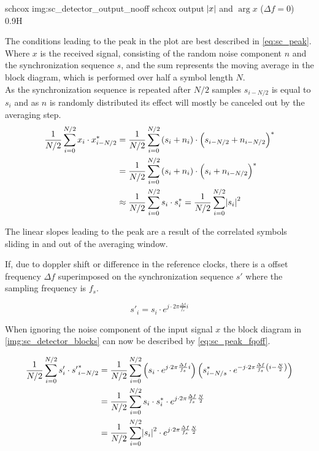 \begin{subchapter}{\acrlong{schcox}}
               {img:sc_detector_output_nooff}
               {\acrshort{schcox} output $\abs{x}$ and $\arg{x}$ ($\Delta f=0$)}
               {0.9}{H}

  The conditions leading to the peak in the plot are best
  described in \autoref{eq:sc_peak}.
  Where $x$ is the received signal, consisting of the
  random noise component $n$ and the synchronization sequence $s$,
  and the sum represents the moving average in the block diagram,
  which is performed over half a symbol length $N$. \\

  As the synchronization sequence is repeated after $N/2$ samples
  $s_{i-N/2}$ is equal to $s_{i}$ and as $n$ is randomly distributed
  its effect will mostly be canceled out by the averaging step. \\

  \begin{align}
    \label{eq:sc_peak}
    \frac{1}{N/2} \sum_{i=0}^{N/2} x_{i} \cdot x_{i-N/2}^\ast &=
    \frac{1}{N/2} \sum_{i=0}^{N/2} \left(s_{i} + n_{i} \right) \cdot \left(s_{i-N/2} + n_{i-N/2} \right)^\ast \nonumber \\
    &= \frac{1}{N/2} \sum_{i=0}^{N/2} \left(s_{i} + n_{i} \right) \cdot \left(s_{i} + n_{i-N/2} \right)^\ast \nonumber \\
    &\approx \frac{1}{N/2} \sum_{i=0}^{N/2} s_{i} \cdot s_{i}^\ast
    = \frac{1}{N/2} \sum_{i=0}^{N/2} \abs{s_{i}}^2
  \end{align}

  The linear slopes leading to the peak are a result of the
  correlated symbols sliding in and out of the averaging
  window.

  If, due to doppler shift or difference in the reference clocks,
  there is a offset frequency $\Delta f$ superimposed on the
  synchronization sequence $s'$ where the sampling frequency is $f_s$.

  \begin{equation*}
    s'_{i}= s_{i} \cdot e^{j\cdot 2 \pi \frac{\Delta f}{f_s}i}
  \end{equation*}

  When ignoring the noise component of the input signal $x$ the
  block diagram in \autoref{img:sc_detector_blocks} can
  now be described by \autoref{eq:sc_peak_fqoff}.

  \begin{align}
    \label{eq:sc_peak_fqoff}
    \frac{1}{N/2} \sum_{i=0}^{N/2} s'_{i} \cdot {s'}_{i-N/2}^{\ast}
    &= \frac{1}{N/2} \sum_{i=0}^{N/2}
     \left( s_{i} \cdot e^{j\cdot 2 \pi \frac{\Delta f}{f_s}i} \right)
     \left( s_{i-N/s}^{\ast} \cdot e^{-j\cdot 2 \pi \frac{\Delta f}{f_s} \left( i- \frac{N}{2} \right)} \right) \nonumber \\
    &= \frac{1}{N/2} \sum_{i=0}^{N/2} s_{i} \cdot s_{i}^\ast \cdot e^{j\cdot 2 \pi \frac{\Delta f}{f_s} \frac{N}{2}} \nonumber \\
    &= \frac{1}{N/2} \sum_{i=0}^{N/2} \abs{s_{i}}^2 \cdot e^{j\cdot 2 \pi \frac{\Delta f}{f_s} \frac{N}{2}}
  \end{align}


\end{subchapter}
